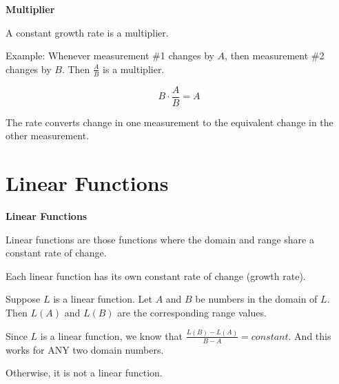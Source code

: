 \documentclass{ximera}
\begin{document}
\begin{idea} \textbf{\textcolor{blue!55!black}{Multiplier}}


A constant growth rate is a multiplier.


Example: Whenever measurement \#1 changes by $A$, then measurement \#2 changes by $B$.  Then $\frac{A}{B}$ is a multiplier.  

\[
B \cdot \frac{A}{B} = A
\]


The rate converts change in one measurement to the equivalent change in the other measurement.

\end{idea}





















\section*{Linear Functions}








\begin{definition} \textbf{\textcolor{green!50!black}{Linear Functions}} 

Linear functions are those functions where the domain and range share a constant rate of change.  

\end{definition}


Each linear function has its own constant rate of change (growth rate). 


Suppose $L$ is a linear function.  Let $A$ and $B$ be numbers in the domain of $L$.  Then $L(A)$ and $L(B)$ are the corresponding range values.

Since $L$ is a linear function, we know that $\frac{L(B) - L(A)}{B - A} = constant$.  And this works for ANY two domain numbers.

Otherwise, it is not a linear function.
\end{document}
